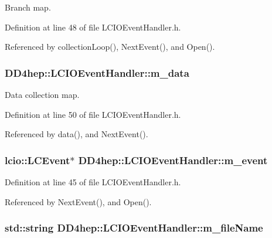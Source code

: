 Branch map. 

Definition at line 48 of file LCIOEventHandler.h.

Referenced by collectionLoop(), NextEvent(), and Open().\hypertarget{class_d_d4hep_1_1_l_c_i_o_event_handler_aad03bcadad9458ec37c9e13209481595}{
\subsubsection[{m\_\-data}]{ {\bf DD4hep::LCIOEventHandler::m\_\-data}}}
\label{class_d_d4hep_1_1_l_c_i_o_event_handler_aad03bcadad9458ec37c9e13209481595}


Data collection map. 

Definition at line 50 of file LCIOEventHandler.h.

Referenced by data(), and NextEvent().\hypertarget{class_d_d4hep_1_1_l_c_i_o_event_handler_a8ec477793e0d557bb46f65953c9366d2}{
\subsubsection[{m\_\-event}]{\setlength{\rightskip}{0pt plus 5cm}lcio::LCEvent$\ast$ {\bf DD4hep::LCIOEventHandler::m\_\-event}}}
\label{class_d_d4hep_1_1_l_c_i_o_event_handler_a8ec477793e0d557bb46f65953c9366d2}


Definition at line 45 of file LCIOEventHandler.h.

Referenced by NextEvent(), and Open().\hypertarget{class_d_d4hep_1_1_l_c_i_o_event_handler_ad46f1b438e65d08e5ebbe5bb8df25347}{
\subsubsection[{m\_\-fileName}]{\setlength{\rightskip}{0pt plus 5cm}std::string {\bf DD4hep::LCIOEventHandler::m\_\-fileName}}}
\label{class_d_d4hep_1_1_l_c_i_o_event_handler_ad46f1b438e65d08e5ebbe5bb8df25347}


